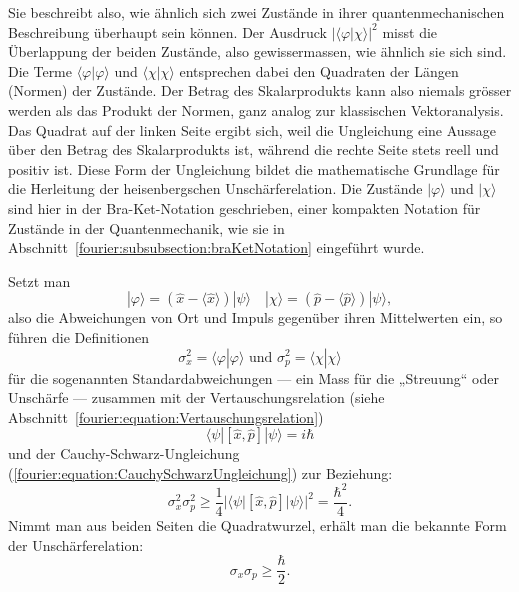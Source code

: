 		Sie beschreibt also, wie ähnlich sich zwei Zustände in ihrer quantenmechanischen Beschreibung überhaupt sein können.
		Der Ausdruck $|\langle\varphi|\chi\rangle|^2$ misst die Überlappung der beiden Zustände, also gewissermassen, wie ähnlich sie sich sind.
		Die Terme $\langle\varphi|\varphi\rangle$ und $\langle\chi|\chi\rangle$ entsprechen dabei den Quadraten der Längen (Normen) der Zustände.
		Der Betrag des Skalarprodukts kann also niemals grösser werden als das Produkt der Normen, ganz analog zur klassischen Vektoranalysis.
		Das Quadrat auf der linken Seite ergibt sich, weil die Ungleichung eine Aussage über den Betrag des Skalarprodukts ist, während die rechte Seite stets reell und positiv ist.
		Diese Form der Ungleichung bildet die mathematische Grundlage für die Herleitung der heisenbergschen Unschärferelation.
		Die Zustände $|\varphi\rangle$ und $|\chi\rangle$ sind hier in der Bra-Ket-Notation geschrieben, einer kompakten Notation für Zustände in der Quantenmechanik,
		wie sie in Abschnitt~\ref{fourier:subsubsection:braKetNotation} eingeführt wurde.

		Setzt man
		\begin{equation}
			|\varphi\rangle = (\hat{x} - \langle \hat{x} \rangle) |\psi\rangle \quad |\chi\rangle = (\hat{p} - \langle \hat{p} \rangle) | \psi\rangle,
		\end{equation}
		also die Abweichungen von Ort und Impuls gegenüber ihren Mittelwerten ein, so führen die Definitionen
		\begin{equation}
			\sigma_x^2 = \langle\varphi | \varphi\rangle \text{ und } \sigma_p^2 = \langle\chi | \chi\rangle
		\end{equation}
		für die sogenannten Standardabweichungen --- ein Mass für die „Streuung“ oder Unschärfe --- zusammen mit der Vertauschungsrelation (siehe Abschnitt~\ref{fourier:equation:Vertauschungsrelation})
		\begin{equation}
			\langle\psi | [\hat{x},\hat{p}] | \psi\rangle = i\hbar
		\end{equation}
		und der Cauchy-Schwarz-Ungleichung (\ref{fourier:equation:CauchySchwarzUngleichung}) zur Beziehung:
		\begin{equation}
			\sigma_x^2 \sigma_p^2 \ge \frac{1}{4} |\langle\psi | [\hat{x},\hat{p}] | \psi\rangle|^2 = \frac{\hbar^2}{4}.
		\end{equation}
		Nimmt man aus beiden Seiten die Quadratwurzel, erhält man die bekannte Form der Unschärferelation:
		\begin{equation}\label{fourier:equation:FormUnschaerferelation}
			\sigma_x \sigma_p \ge \frac{\hbar}{2}.
		\end{equation}

